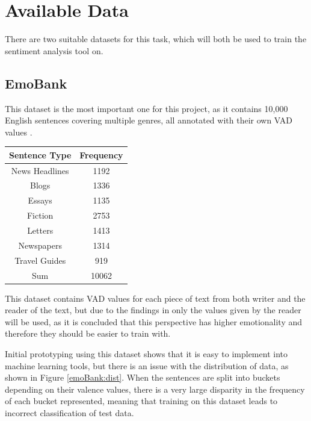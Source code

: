 
\section{Available Data}
There are two suitable datasets for this task, which will both be used to train the sentiment analysis tool on.
\subsection{EmoBank}
This dataset is the most important one for this project, as it contains 10,000 English sentences covering multiple genres, all annotated with their own VAD values \cite{emoBank}.

\begin{center}
\begin{tabular}{ |c|c| } 
 \hline
  Sentence Type & Frequency \\ 
 \hline         
 News Headlines & 1192 \\
 Blogs & 1336 \\
 Essays & 1135 \\
 Fiction & 2753 \\
 Letters & 1413 \\
Newspapers & 1314 \\
 Travel Guides & 919\\
 \hline
 Sum & 10062 \\
 \hline
\end{tabular}
\end{center}

This dataset contains VAD values for each piece of text from both writer and the reader of the text, but due to the findings in \cite{emoBank} only the values given by the reader will be used, as it is concluded that this perspective has higher emotionality and therefore they should be easier to train with.

Initial prototyping using this dataset shows that it is easy to implement into machine learning tools, but there is an issue with the distribution of data, as shown in Figure \ref{emoBank:dist}. When the sentences are split into buckets depending on their valence values, there is a very large disparity in the frequency of each bucket represented, meaning that training on this dataset leads to incorrect classification of test data.

